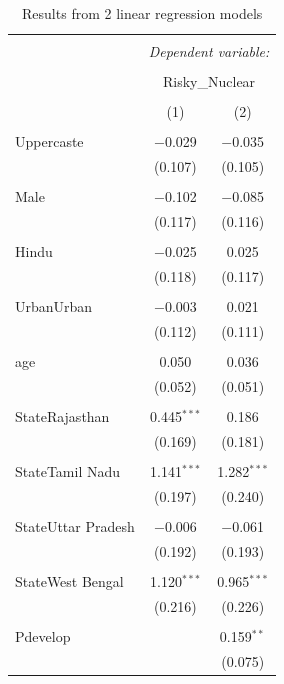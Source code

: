 \documentclass[
]{article}
\begin{document}
\begin{table}[!htbp] \centering 
  \caption{Results from 2 linear regression models} 
  \label{} 
\begin{tabular}{@{\extracolsep{5pt}}lcc} 
\\[-1.8ex]\hline 
\hline \\[-1.8ex] 
 & \multicolumn{2}{c}{\textit{Dependent variable:}} \\ 
\cline{2-3} 
\\[-1.8ex] & \multicolumn{2}{c}{Risky\_Nuclear} \\ 
\\[-1.8ex] & (1) & (2)\\ 
\hline \\[-1.8ex] 
 Uppercaste & $-$0.029 & $-$0.035 \\ 
  & (0.107) & (0.105) \\ 
  & & \\ 
 Male & $-$0.102 & $-$0.085 \\ 
  & (0.117) & (0.116) \\ 
  & & \\ 
 Hindu & $-$0.025 & 0.025 \\ 
  & (0.118) & (0.117) \\ 
  & & \\ 
 UrbanUrban & $-$0.003 & 0.021 \\ 
  & (0.112) & (0.111) \\ 
  & & \\ 
 age & 0.050 & 0.036 \\ 
  & (0.052) & (0.051) \\ 
  & & \\ 
 StateRajasthan & 0.445$^{***}$ & 0.186 \\ 
  & (0.169) & (0.181) \\ 
  & & \\ 
 StateTamil Nadu & 1.141$^{***}$ & 1.282$^{***}$ \\ 
  & (0.197) & (0.240) \\ 
  & & \\ 
 StateUttar Pradesh & $-$0.006 & $-$0.061 \\ 
  & (0.192) & (0.193) \\ 
  & & \\ 
 StateWest Bengal & 1.120$^{***}$ & 0.965$^{***}$ \\ 
  & (0.216) & (0.226) \\ 
  & & \\ 
 Pdevelop &  & 0.159$^{**}$ \\ 
  &  & (0.075) \\ 

\end{tabular}
\end{table}
\end{document}
